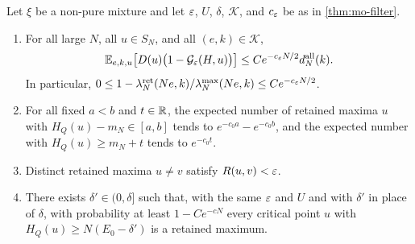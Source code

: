 \begin{proposition}\label{prop:mo-filter-loss}
Let $\xi$ be a non-pure mixture and let $\varepsilon$, $U$, $\delta$, $\mathcal K$, and $c_\varepsilon$ be as in \cref{thm:mo-filter}.
\begin{enumerate}
\item[(a)] For all large $N$, all $u\in S_N$, and all $(e,k)\in\mathcal K$,
\begin{equation}\label{eq:mo-relative-loss}
\mathbb E_{e,k,u}\bigl[D(u)\bigl(1-\mathcal G_\varepsilon(H,u)\bigr)\bigr]\le Ce^{-c_\varepsilon N/2}d_N^{\rm all}(k).
\end{equation}
In particular, $0\le1-\lambda_N^{\rm ret}(Ne,k)/\lambda_N^{\max}(Ne,k)\le Ce^{-c_\varepsilon N/2}$.
\item[(b)] For all fixed $a<b$ and $t\in\mathbb R$, the expected number of retained maxima $u$ with $H_Q(u)-m_N\in[a,b]$ tends to $e^{-c_0a}-e^{-c_0b}$, and the expected number with $H_Q(u)\ge m_N+t$ tends to $e^{-c_0t}$.
\item[(c)] Distinct retained maxima $u\ne v$ satisfy $R(u,v)<\varepsilon$.
\item[(d)] There exists $\delta'\in(0,\delta]$ such that, with the same $\varepsilon$ and $U$ and with $\delta'$ in place of $\delta$, with probability at least $1-Ce^{-cN}$ every critical point $u$ with $H_Q(u)\ge N(E_0-\delta')$ is a retained maximum.
\end{enumerate}
\end{proposition}

